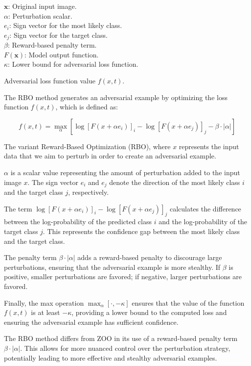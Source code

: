 $\mathbf{x}$: Original input image. \\
$\alpha$: Perturbation scalar. \\
$e_i$: Sign vector for the most likely class. \\
$e_j$: Sign vector for the target class. \\
$\beta$: Reward-based penalty term. \\
$F(\mathbf{x})$: Model output function. \\
$\kappa$: Lower bound for adversarial loss function.

Adversarial loss function value $f(x, t)$.

The RBO method generates an adversarial example by optimizing the loss function $f(x, t)$, which is defined as:

\[
f(x, t) = \max_{\alpha} \left[ \log[F(x + \alpha e_i)]_i - \log[F(x + \alpha e_j)]_j - \beta \cdot |\alpha| \right]
\]

The variant Reward-Based Optimization (RBO), where $x$ represents the input data that we aim to perturb in order to create an adversarial example.

$\alpha$ is a scalar value representing the amount of perturbation added to the input image $x$. The sign vector $e_i$ and $e_j$ denote the direction of the most likely class $i$ and the target class $j$, respectively.

The term $\log[F(x + \alpha e_i)]_i - \log[F(x + \alpha e_j)]_j$ calculates the difference between the log-probability of the predicted class $i$ and the log-probability of the target class $j$. This represents the confidence gap between the most likely class and the target class.

The penalty term $\beta \cdot |\alpha|$ adds a reward-based penalty to discourage large perturbations, ensuring that the adversarial example is more stealthy. If $\beta$ is positive, smaller perturbations are favored; if negative, larger perturbations are favored.

Finally, the max operation $\max_{\alpha} \left[ \cdot, -\kappa \right]$ ensures that the value of the function $f(x, t)$ is at least $-\kappa$, providing a lower bound to the computed loss and ensuring the adversarial example has sufficient confidence.

The RBO method differs from ZOO in its use of a reward-based penalty term $\beta \cdot |\alpha|$. This allows for more nuanced control over the perturbation strategy, potentially leading to more effective and stealthy adversarial examples.